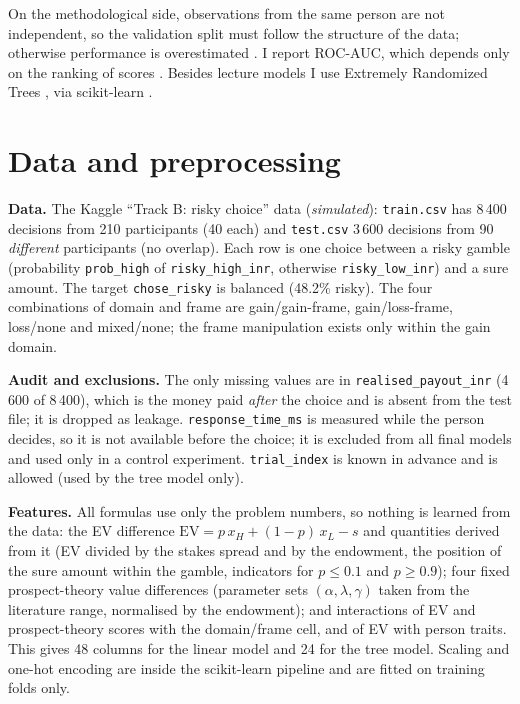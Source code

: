 \documentclass[11pt,a4paper]{article}
\begin{document}
On the methodological side, observations from the same person are not independent, so the validation split must
follow the structure of the data; otherwise performance is overestimated \citep{roberts2017}. I report ROC-AUC,
which depends only on the ranking of scores \citep{fawcett2006}. Besides lecture models I use Extremely
Randomized Trees \citep{geurts2006}, via scikit-learn \citep{pedregosa2011}.

\section{Data and preprocessing}
\textbf{Data.} The Kaggle ``Track B: risky choice'' data (\emph{simulated}): \texttt{train.csv} has 8\,400
decisions from 210 participants (40 each) and \texttt{test.csv} 3\,600 decisions from 90 \emph{different}
participants (no overlap). Each row is one choice between a risky gamble (probability \texttt{prob\_high} of
\texttt{risky\_high\_inr}, otherwise \texttt{risky\_low\_inr}) and a sure amount. The target
\texttt{chose\_risky} is balanced (48.2\% risky). The four combinations of domain and frame are
gain/gain-frame, gain/loss-frame, loss/none and mixed/none; the frame manipulation exists only within the gain
domain.

\textbf{Audit and exclusions.} The only missing values are in \texttt{realised\_payout\_inr} (4\,600 of 8\,400),
which is the money paid \emph{after} the choice and is absent from the test file; it is dropped as leakage.
\texttt{response\_time\_ms} is measured while the person decides, so it is not available before the choice; it is
excluded from all final models and used only in a control experiment. \texttt{trial\_index} is known in advance
and is allowed (used by the tree model only).

\textbf{Features.} All formulas use only the problem numbers, so nothing is learned from the data:
the EV difference $\mathrm{EV}=p\,x_H+(1-p)\,x_L-s$ and quantities derived from it (EV divided by the
stakes spread and by the endowment, the position of the sure amount within the gamble, indicators for
$p\le0.1$ and $p\ge0.9$); four fixed prospect-theory value differences (parameter sets
$(\alpha,\lambda,\gamma)$ taken from the literature range, normalised by the endowment); and interactions of EV and
prospect-theory scores with the domain/frame cell, and of EV with person traits. This gives 48 columns for the
linear model and 24 for the tree model. Scaling and one-hot encoding are inside the scikit-learn pipeline and are
fitted on training folds only.
\end{document}
